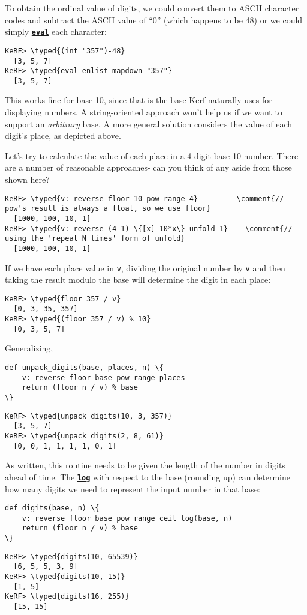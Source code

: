 \documentclass{article}
\newcommand{\typed}[1]{\textcolor{TealBlue}{#1}}
\newcommand{\comment}[1]{\textcolor{Orange}{#1}}
\newcommand{\primu}[2]{\hyperref[prim:#2]{\textbf{\texttt{#1}}}}
\newcommand{\prim}[1]{\primu{#1}{#1}}
\begin{document}
To obtain the ordinal value of digits, we could convert them to ASCII character codes and subtract the ASCII value of ``0'' (which happens to be 48) or we could simply \prim{eval} each character:
\begin{Verbatim}
KeRF> \typed{(int "357")-48}
  [3, 5, 7]
KeRF> \typed{eval enlist mapdown "357"}
  [3, 5, 7]
\end{Verbatim}

This works fine for base-10, since that is the base Kerf naturally uses for displaying numbers. A string-oriented approach won't help us if we want to support an \emph{arbitrary} base. A more general solution considers the value of each digit's place, as depicted above.

\vspace{0.5cm}

Let's try to calculate the value of each place in a 4-digit base-10 number. There are a number of reasonable approaches- can you think of any aside from those shown here?
\begin{Verbatim}
KeRF> \typed{v: reverse floor 10 pow range 4}         \comment{// pow's result is always a float, so we use floor}
  [1000, 100, 10, 1]
KeRF> \typed{v: reverse (4-1) \{[x] 10*x\} unfold 1}    \comment{// using the 'repeat N times' form of unfold}
  [1000, 100, 10, 1]
\end{Verbatim}

If we have each place value in \texttt{v}, dividing the original number by \texttt{v} and then taking the result modulo the base will determine the digit in each place:
\begin{Verbatim}
KeRF> \typed{floor 357 / v}
  [0, 3, 35, 357]
KeRF> \typed{(floor 357 / v) % 10}
  [0, 3, 5, 7]
\end{Verbatim}

Generalizing,
\begin{Verbatim}
def unpack_digits(base, places, n) \{
	v: reverse floor base pow range places
	return (floor n / v) % base
\}
\end{Verbatim}
\begin{Verbatim}
KeRF> \typed{unpack_digits(10, 3, 357)}
  [3, 5, 7]
KeRF> \typed{unpack_digits(2, 8, 61)}
  [0, 0, 1, 1, 1, 1, 0, 1]
\end{Verbatim}

As written, this routine needs to be given the length of the number in digits ahead of time. The \prim{log} with respect to the base (rounding up) can determine how many digits we need to represent the input number in that base:
\begin{Verbatim}
def digits(base, n) \{
	v: reverse floor base pow range ceil log(base, n)
	return (floor n / v) % base
\}
\end{Verbatim}
\begin{Verbatim}
KeRF> \typed{digits(10, 65539)}
  [6, 5, 5, 3, 9]
KeRF> \typed{digits(10, 15)}
  [1, 5]
KeRF> \typed{digits(16, 255)}
  [15, 15]
\end{Verbatim}
\end{document}
